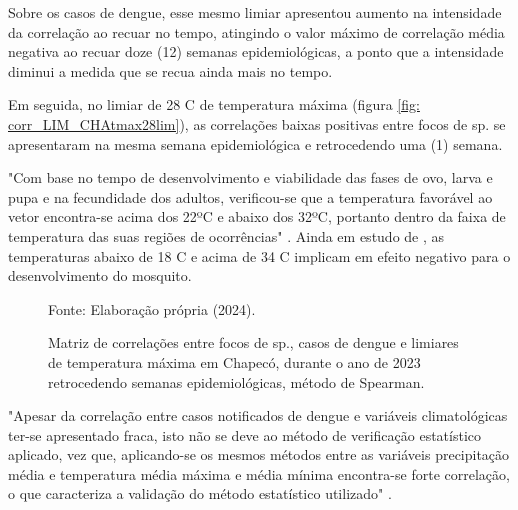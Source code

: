 \indent Sobre os casos de dengue, esse mesmo limiar apresentou aumento na intensidade da correlação ao recuar no tempo, atingindo o valor máximo de correlação média negativa ao recuar doze (12) semanas epidemiológicas, a ponto que a intensidade diminui a medida que se recua ainda mais no tempo.

\indent Em seguida, no limiar de 28 C de temperatura máxima (figura \ref{fig: corr_LIM_CHAtmax28lim}), as correlações baixas positivas entre focos de  sp. se apresentaram na mesma semana epidemiológica e retrocedendo uma (1) semana.


\indent "Com base no tempo de desenvolvimento e viabilidade das fases de ovo, larva e pupa e na fecundidade dos adultos, verificou-se que a temperatura favorável ao vetor encontra-se acima dos 22ºC e abaixo dos 32ºC, portanto dentro da faixa de temperatura das suas regiões de ocorrências" \cite{AedesTemp}. Ainda em estudo de , as temperaturas abaixo de 18 C e acima de 34 C implicam em efeito negativo para o desenvolvimento do mosquito.

\begin{figure}[htbp]
    \begin{center}
    \caption{Matriz de correlações entre focos de  sp., casos de dengue e limiares de temperatura máxima em Chapecó, durante o ano de 2023 retrocedendo semanas epidemiológicas, método de Spearman.}
    \label{fig: matriz_corr_LIM_CHAtmax}
        \hfill
    \end{center}
    \small{Fonte: Elaboração própria (2024).}
\end{figure}

\begin{citacao}
"Apesar da correlação entre casos notificados de dengue e variáveis climatológicas ter-se apresentado fraca, isto não se deve ao método de verificação estatístico aplicado, vez que, aplicando-se os mesmos métodos entre as variáveis precipitação média e temperatura média máxima e média mínima encontra-se forte correlação, o que caracteriza a validação do método estatístico utilizado" \cite[pg-81]{Barbosa2011Dissertação}.
\end{citacao}

